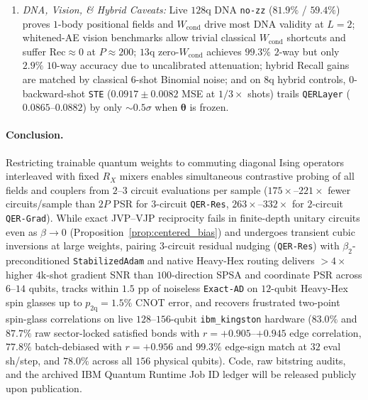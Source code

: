 \documentclass[11pt]{article}
\begin{document}
\begin{enumerate}[leftmargin=1.4em,itemsep=2pt,topsep=2pt]
  \item \emph{DNA, Vision, \& Hybrid Caveats:} Live $128$q DNA \texttt{no-zz} ($81.9\%$ / $59.4\%$) proves $1$-body positional fields and $W_{\text{cond}}$ drive most DNA validity at $L{=}2$; whitened-AE vision benchmarks allow trivial classical $W_{\text{cond}}$ shortcuts and suffer $\text{Rec}\approx 0$ at $P{\approx}200$; $13$q zero-$W_{\text{cond}}$ achieves $99.3\%$ $2$-way but only $2.9\%$ $10$-way accuracy due to uncalibrated attenuation; hybrid Recall gains are matched by classical $6$-shot Binomial noise; and on $8$q hybrid controls, $0$-backward-shot \texttt{STE} ($0.0917\pm 0.0082$ MSE at $1/3\times$ shots) trails \texttt{QERLayer} ($0.0865$--$0.0882$) by only $\sim 0.5\sigma$ when $\boldsymbol{\theta}$ is frozen.
\end{enumerate}

\paragraph{Conclusion.}
Restricting trainable quantum weights to commuting diagonal Ising operators interleaved with fixed $R_X$ mixers enables simultaneous contrastive probing of all fields and couplers from $2$--$3$ circuit evaluations per sample ($175\times$--$221\times$ fewer circuits/sample than $2P$ PSR for $3$-circuit \texttt{QER-Res}, $263\times$--$332\times$ for $2$-circuit \texttt{QER-Grad}). While exact JVP--VJP reciprocity fails in finite-depth unitary circuits even as $\beta{\to}0$ (Proposition~\ref{prop:centered_bias}) and undergoes transient cubic inversions at large weights, pairing $3$-circuit residual nudging (\texttt{QER-Res}) with $\beta_2$-preconditioned \texttt{StabilizedAdam} and native Heavy-Hex routing delivers $>4\times$ higher $4\text{k}$-shot gradient SNR than $100$-direction SPSA and coordinate PSR across $6$--$14$ qubits, tracks within $1.5\text{ pp}$ of noiseless \texttt{Exact-AD} on $12$-qubit Heavy-Hex spin glasses up to $p_{2\text{q}}{=}1.5\%$ CNOT error, and recovers frustrated two-point spin-glass correlations on live $128$--$156$-qubit \texttt{ibm\_kingston} hardware ($83.0\%$ and $87.7\%$ raw sector-locked satisfied bonds with $r{=}+0.905$--$+0.945$ edge correlation, $77.8\%$ batch-debiased with $r{=}+0.956$ and $99.3\%$ edge-sign match at $32$ eval sh/step, and $78.0\%$ across all $156$ physical qubits). Code, raw bitstring audits, and the archived IBM Quantum Runtime Job ID ledger will be released publicly upon publication.
\end{document}
